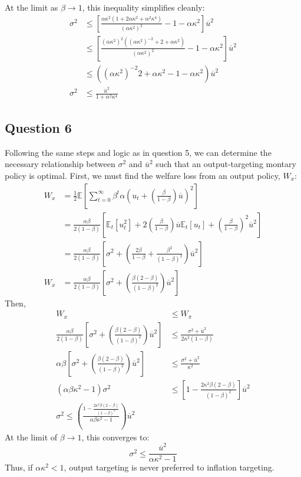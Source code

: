 \documentclass{article}
\newcommand{\E}[1]{\mathbb{E}\left[#1\right]} %
\newcommand{\Et}[1]{\mathbb{E}_t\left[#1\right]}
\begin{document}
At the limit as $\beta\rightarrow 1$, this inequality simplifies cleanly:
\begin{align*}
	\sigma^2 	&\leq \left[\frac{\alpha\kappa^2(1+2\alpha\kappa^2 + \alpha^2\kappa^4)}{(\alpha\kappa^2)^2} - 1-\alpha\kappa^2\right]\overline{u}^2	\\
				&\leq \left[\frac{(\alpha\kappa^2)^2((\alpha\kappa^2)^{-2} + 2 + \alpha\kappa^2)}{(\alpha\kappa^2)^2} - 1-\alpha\kappa^2\right]\overline{u}^2				\\
				&\leq \left((\alpha\kappa^2)^{-2} 2 + \alpha\kappa^2 - 1-\alpha\kappa^2\right)\overline{u}^2																\\
	\sigma^2 	&\leq \frac{\overline{u}^2}{1 + \alpha^2\kappa^4}	
\end{align*}



\subsection*{Question 6}
Following the same steps and logic as in question 5, we can determine the necessary relationship between $\sigma^2$ and $\overline{u}^2$ such that an output-targeting montary policy is optimal. First, we must find the welfare loss from an output policy, $W_x$:
\begin{align*}
	W_x	&= \frac{1}{2}\E{\sum_{t=0}^\infty\beta^t\alpha\left(u_t + \left(\frac{\beta}{1-\beta}\right)\overline{u}\right)^2}	\\
		&= \frac{\alpha\beta}{2(1-\beta)}\left[\Et{u_t^2} + 2\left(\frac{\beta}{1-\beta}\right)\overline{u}\Et{u_t} + \left(\frac{\beta}{1-\beta}\right)^2\overline{u}^2\right]	\\
		&= \frac{\alpha\beta}{2(1-\beta)}\left[\sigma^2 + \left(\frac{2\beta}{1-\beta} + \frac{\beta^2}{(1-\beta)^2}\right)\overline{u}^2\right]	\\
	W_x	&= \frac{\alpha\beta}{2(1-\beta)}\left[\sigma^2 + \left(\frac{\beta(2-\beta)}{(1-\beta)^2}\right)\overline{u}^2\right]
\end{align*}
Then,
\begin{align*}
	W_x	&\leq W_\pi \\
	\frac{\alpha\beta}{2(1-\beta)}\left[\sigma^2 + \left(\frac{\beta(2-\beta)}{(1-\beta)^2}\right)\overline{u}^2\right]
		&\leq \frac{\sigma^2+\overline{u}^2}{2\kappa^2(1-\beta)}	\\
	\alpha\beta\left[\sigma^2 + \left(\frac{\beta(2-\beta)}{(1-\beta)^2}\right)\overline{u}^2\right]
		&\leq \frac{\sigma^2+\overline{u}^2}{\kappa^2}	\\
	(\alpha\beta\kappa^2-1)\sigma^2 &\leq \left[1 - \frac{2\kappa^2\beta(2-\beta)}{(1-\beta)^2}\right]\overline{u}^2	\\
	\sigma^2 \leq \left(\frac{1 - \frac{2\kappa^2\beta(2-\beta)}{(1-\beta)^2}}{\alpha\beta\kappa^2-1}\right)\overline{u}^2
\end{align*}
At the limit of $\beta\rightarrow 1$, this converges to:
\[
	\sigma^2 \leq \frac{\overline{u}^2}{\alpha\kappa^2-1}
\]
Thus, if $\alpha\kappa^2<1$, output targeting is never preferred to inflation targeting.
\end{document}
